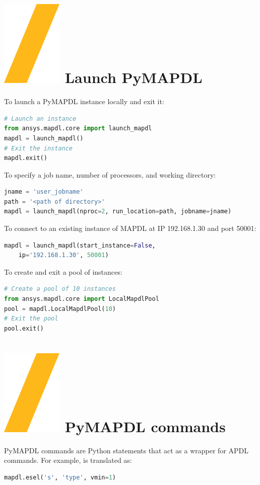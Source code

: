 \documentclass[9pt,landscape]{article}
\begin{document}
\begin{multicols}{3}
\setlength{\premulticols}{1pt}
\setlength{\postmulticols}{1pt}
\setlength{\multicolsep}{1pt}
\setlength{\columnsep}{2pt}

\section{\includegraphics[height=\fontcharht\font`\S]{slash.png} Launch PyMAPDL}
To launch a PyMAPDL instance locally and exit it:
\begin{lstlisting}[language=Python]
# Launch an instance
from ansys.mapdl.core import launch_mapdl
mapdl = launch_mapdl()
# Exit the instance
mapdl.exit()
\end{lstlisting}

To specify a job name, number of processors, and working directory:
\begin{lstlisting}[language=Python]
jname = 'user_jobname'
path = '<path of directory>'
mapdl = launch_mapdl(nproc=2, run_location=path, jobname=jname)
\end{lstlisting}

To connect to an existing instance of MAPDL at IP 192.168.1.30 and port 50001:
\begin{lstlisting}[language=Python]
mapdl = launch_mapdl(start_instance=False,
    ip='192.168.1.30', 50001)
\end{lstlisting}
To create and exit a pool of instances:
\begin{lstlisting}[language=Python]
# Create a pool of 10 instances
from ansys.mapdl.core import LocalMapdlPool
pool = mapdl.LocalMapdlPool(10)
# Exit the pool
pool.exit()
\end{lstlisting}

\section{\includegraphics[height=\fontcharht\font`\S]{slash.png} PyMAPDL commands}
PyMAPDL commands are Python statements that act as a wrapper for APDL commands. For example,  is translated as:
\begin{lstlisting}[language=Python]
mapdl.esel('s', 'type', vmin=1) 
\end{lstlisting}


\end{multicols}
\end{document}
